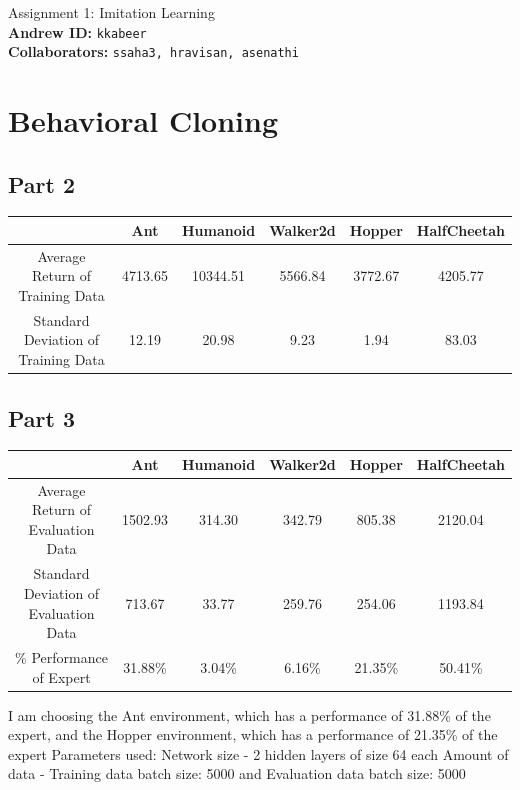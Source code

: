 \documentclass{article}
\begin{document}

\begin{centering}
    {\Large Assignment 1: Imitation Learning} \\
    \vspace{.25cm}
    \textbf{Andrew ID:} \texttt{kkabeer} \\
    \textbf{Collaborators:} \texttt{ssaha3, hravisan, asenathi}\\ 
\end{centering}

\vspace{.5cm}

\section{Behavioral Cloning}
\subsection{Part 2}

\begin{center}
  \begin{tabular}{ |c|c|c|c|c|c| } 
   \hline
    & Ant & Humanoid & Walker2d & Hopper & HalfCheetah \\ 
    \hline
   Average Return of Training Data & 4713.65 & 10344.51 & 5566.84 & 3772.67 & 4205.77 \\ 
   Standard Deviation of Training Data & 12.19 & 20.98 & 9.23 & 1.94 & 83.03\\ 
   \hline
  \end{tabular}
\end{center}

\subsection{Part 3}

\begin{center}
  \begin{tabular}{ |c|c|c|c|c|c| } 
   \hline
    & Ant & Humanoid & Walker2d & Hopper & HalfCheetah \\ 
    \hline
   Average Return of Evaluation Data & 1502.93 & 314.30 & 342.79 & 805.38 & 2120.04 \\ 
   Standard Deviation of Evaluation Data & 713.67 & 33.77 & 259.76 & 254.06 & 1193.84 \\
   \% Performance of Expert & 31.88\% & 3.04\% & 6.16\% & 21.35\% & 50.41\% \\
   \hline
  \end{tabular}
\end{center}
I am choosing the Ant environment, which has a performance of 31.88\% of the expert, and the Hopper environment, which has a performance of 21.35\% of the expert
Parameters used:
Network size - 2 hidden layers of size 64 each
Amount of data - Training data batch size: 5000 and Evaluation data batch size: 5000
\end{document}
